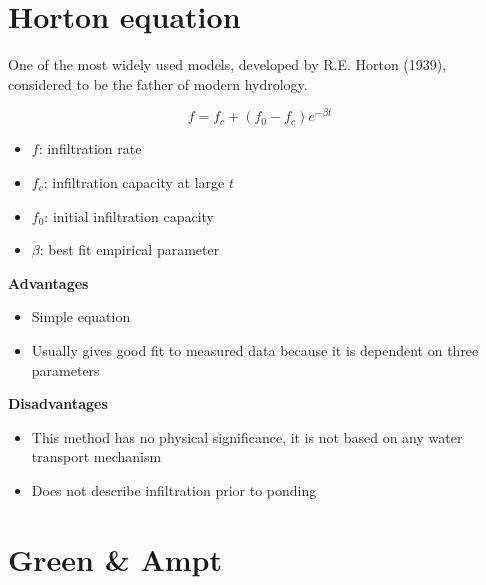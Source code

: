 \documentclass[
  letterpaper,
  DIV=11,
  numbers=noendperiod]{scrreprt}
\providecommand{\tightlist}{%
  \setlength{\itemsep}{0pt}\setlength{\parskip}{0pt}}\usepackage{longtable,booktabs,array}
\begin{document}
\hypertarget{horton-equation}{%
\section{Horton equation}\label{horton-equation}}

One of the most widely used models, developed by R.E. Horton (1939),
considered to be the father of modern hydrology.

\[
f = f_c+(f_0-f_c)e^{-\beta t}
\]

\begin{itemize}
\tightlist
\item
  \(f\): infiltration rate
\item
  \(f_c\): infiltration capacity at large \(t\)
\item
  \(f_0\): initial infiltration capacity
\item
  \(\beta\): best fit empirical parameter
\end{itemize}

\textbf{Advantages}

\begin{itemize}
\tightlist
\item
  Simple equation
\item
  Usually gives good fit to measured data because it is dependent on
  three parameters
\end{itemize}

\textbf{Disadvantages}

\begin{itemize}
\tightlist
\item
  This method has no physical significance, it is not based on any water
  transport mechanism
\item
  Does not describe infiltration prior to ponding
\end{itemize}

\hypertarget{green-ampt}{%
\section{Green \& Ampt}\label{green-ampt}}
\end{document}

